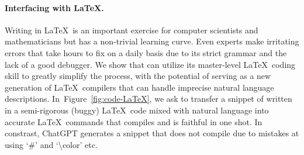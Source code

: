 \paragraph{Interfacing with \LaTeX.} Writing in \LaTeX\ is an important exercise for computer scientists and mathematicians but has a non-trivial learning curve. Even experts make irritating errors that take hours to fix on a daily basis due to its strict grammar and the lack of a good debugger. We show that {\DV} can utilize its master-level \LaTeX\ coding skill to greatly simplify the process, with the potential of serving as a new generation of \LaTeX\ compilers that can handle imprecise natural language descriptions. In~Figure~\ref{fig:code-LaTeX}, we ask {\DV} to transfer a snippet of written in a semi-rigorous (buggy) \LaTeX\ code mixed with natural language into accurate \LaTeX\ commands that compiles and is faithful in one shot. In constrast, ChatGPT generates a snippet that does not compile due to mistakes at using `\#' and `\textbackslash{color}' etc.

